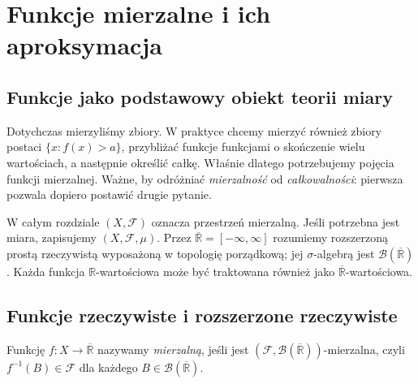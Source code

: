 \chapter{Funkcje mierzalne i ich aproksymacja}
\label{ch:funkcje-mierzalne}

\section{Funkcje jako podstawowy obiekt teorii miary}

Dotychczas mierzyliśmy zbiory. W praktyce chcemy mierzyć
również zbiory postaci $\{x:f(x)>a\}$, przybliżać
funkcje funkcjami o skończenie wielu wartościach, a następnie
określić całkę. Właśnie dlatego potrzebujemy pojęcia
funkcji mierzalnej. Ważne, by odróżniać \emph{mierzalność}
od \emph{całkowalności}: pierwsza pozwala dopiero
postawić drugie pytanie.

W całym rozdziale $(X,\mathcal F)$ oznacza przestrzeń mierzalną.
Jeśli potrzebna jest miara, zapisujemy $(X,\mathcal F,\mu)$.
Przez $\overline{\mathbb R}=[-\infty,\infty]$ rozumiemy
rozszerzoną prostą rzeczywistą wyposażoną w topologię
porządkową; jej $\sigma$-algebrą jest
$\mathcal B(\overline{\mathbb R})$. Każda funkcja
$\mathbb R$-wartościowa może być traktowana również jako
$\overline{\mathbb R}$-wartościowa.

\section{Funkcje rzeczywiste i rozszerzone rzeczywiste}

\begin{definicja}
\label{def:extended-measurable}
Funkcję $f:X\to\overline{\mathbb R}$ nazywamy
\emph{mierzalną}, jeśli jest
$(\mathcal F,\mathcal B(\overline{\mathbb R}))$-mierzalna,
czyli $f^{-1}(B)\in\mathcal F$ dla każdego
$B\in\mathcal B(\overline{\mathbb R})$.
\end{definicja}

